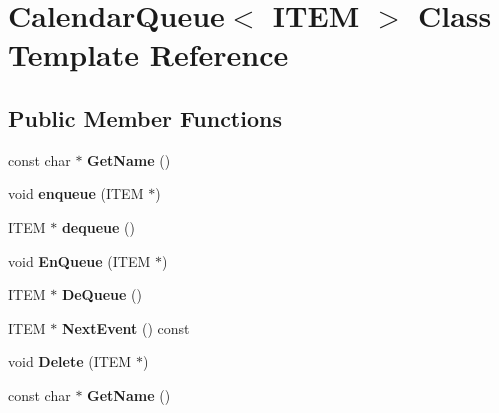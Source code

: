 \hypertarget{classCalendarQueue}{}\section{Calendar\+Queue$<$ I\+T\+EM $>$ Class Template Reference}
\label{classCalendarQueue}
\subsection*{Public Member Functions}
\begin{DoxyCompactItemize}
\item 
\mbox{\label{classCalendarQueue_a539de59828480679148b6477e8ca32d5}} 
const char $\ast$ {\bfseries Get\+Name} ()
\item 
\mbox{\label{classCalendarQueue_a7c78e7557d6b2d22d6efec3f2ad25916}} 
void {\bfseries enqueue} (I\+T\+EM $\ast$)
\item 
\mbox{\label{classCalendarQueue_a7f3132a2003c0cc177b56c816476745d}} 
I\+T\+EM $\ast$ {\bfseries dequeue} ()
\item 
\mbox{\label{classCalendarQueue_af0e8175c51f8c76b6a8d84a41d193ba1}} 
void {\bfseries En\+Queue} (I\+T\+EM $\ast$)
\item 
\mbox{\label{classCalendarQueue_a0fbb9d1c516d6d7c016f97cdd88b3087}} 
I\+T\+EM $\ast$ {\bfseries De\+Queue} ()
\item 
\mbox{\label{classCalendarQueue_aa55882407726551d58d0759c57097acb}} 
I\+T\+EM $\ast$ {\bfseries Next\+Event} () const
\item 
\mbox{\label{classCalendarQueue_a88f7fc7197f7bdeac46bd48f14ec1623}} 
void {\bfseries Delete} (I\+T\+EM $\ast$)
\item 
\mbox{\label{classCalendarQueue_a6634c9294b3e97b03fd4d8f0acb32f52}} 
const char $\ast$ {\bfseries Get\+Name} ()
\item 
\mbox{\label{classCalendarQueue_a7c78e7557d6b2d22d6efec3f2ad25916}} 

\end{DoxyCompactItemize}
